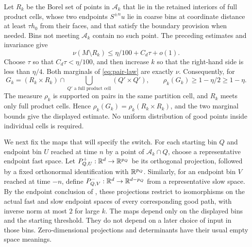 Let $R_k$ be the Borel set of points in $\mathcal A_k$ that lie in the
retained interiors of full product cells, whose two endpoints $S^{\pm n}u$
lie in coarse bins at coordinate distance at least $\tau h_0$ from
their faces, and that satisfy the boundary provision when needed.
Bins not meeting $\mathcal A_k$ contain no such point.  The preceding
estimates and invariance give
\begin{equation}\label{eq:retained-point-loss}
 \nu(M\setminus R_k)\le \eta/100+C_d\tau+o(1).
\end{equation}
Choose $\tau$ so that $C_d\tau<\eta/100$, and then increase $k$ so
that the right-hand side is less than $\eta/4$.
Both marginals of \eqref{eq:pair-law} are exactly $\nu$.  Consequently,
for
\begin{equation}\label{eq:retained-pairs}
 G_k=(R_k\times R_k)\cap
       \bigcup_{Q'\text{ a full product cell}}(Q'\times Q'),
 \qquad \rho_k(G_k)\ge1-\eta/2\ge1-\eta.
\end{equation}
The measure $\rho_k$ is supported on pairs in the same partition cell,
and $R_k$ meets only full product cells.  Hence
$\rho_k(G_k)=\rho_k(R_k\times R_k)$, and the two marginal bounds give
the displayed estimate.  No uniform distribution of good points inside
individual cells is required.

We next fix the maps that will specify the switch.  For each starting
bin $Q$ and endpoint bin $U$ reached at time $n$ by a point of
$\mathcal A_k\cap Q$, choose a representative endpoint fast space.
Let $P^+_{Q,U}:\mathbb R^d\to\mathbb R^{p_Q}$ be its orthogonal projection, followed
by a fixed orthonormal identification with $\mathbb R^{p_Q}$.  Similarly, for
an endpoint bin $V$ reached at time $-n$, define
$P^-_{Q,V}:\mathbb R^d\to\mathbb R^{d-p_Q}$ from a representative slow space.
By the endpoint conclusion of , these projections
restrict to isomorphisms on the actual fast and slow endpoint spaces
of every corresponding good path, with inverse norm at most $2$ for
large $k$.  The maps depend only on the displayed bins and the starting
threshold.  They do not depend on a later choice of input in those bins.
Zero-dimensional projections and determinants have their usual empty
space meanings.

